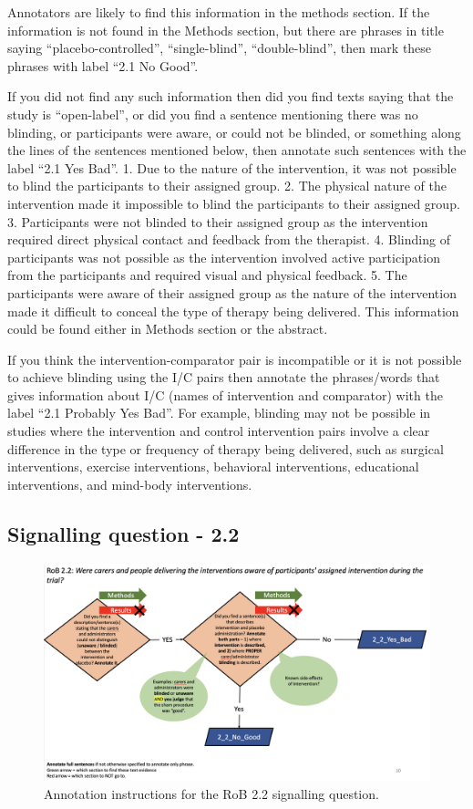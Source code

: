 \documentclass[sn-mathphys,Numbered]{sn-jnl}%
\begin{document}
Annotators are likely to find this information in the methods section.
If the information is not found in the Methods section, but there are phrases in title saying ``placebo-controlled'', ``single-blind'', ``double-blind'', then mark these phrases with label ``2.1 No Good''.

If you did not find any such information then did you find texts saying that the study is ``open-label'', or did you find a sentence mentioning there was no blinding, or participants were aware, or could not be blinded, or something along the lines of the sentences mentioned below, then annotate such sentences with the label ``2.1 Yes Bad''.
1. Due to the nature of the intervention, it was not possible to blind the participants to their assigned group.
2. The physical nature of the intervention made it impossible to blind the participants to their assigned group.
3. Participants were not blinded to their assigned group as the intervention required direct physical contact and feedback from the therapist.
4. Blinding of participants was not possible as the intervention involved active participation from the participants and required visual and physical feedback.
5. The participants were aware of their assigned group as the nature of the intervention made it difficult to conceal the type of therapy being delivered.
This information could be found either in Methods section or the abstract.

If you think the intervention-comparator pair is incompatible or it is not possible to achieve blinding using the I/C pairs then annotate the phrases/words that gives information about I/C (names of intervention and comparator) with the label ``2.1 Probably Yes Bad''.
For example, blinding may not be possible in studies where the intervention and control intervention pairs involve a clear difference in the type or frequency of therapy being delivered, such as surgical interventions, exercise interventions, behavioral interventions, educational interventions, and mind-body interventions.
%
%
%
\subsection*{Signalling question - 2.2}
\label{subsec:2_2}
%

%
\begin{figure}[hbt]
    \centering
    \includegraphics[width=\textwidth]{figures/2_2.png}
    \caption{Annotation instructions for the RoB 2.2 signalling question.}
    \label{fig:2_2}
\end{figure}
%
\end{document}

